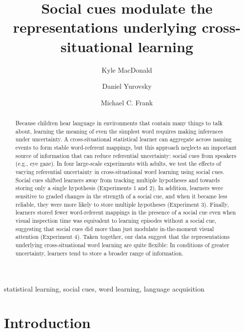 \documentclass[authoryear, review]{elsarticle}
\date{}
\begin{document}
\begin{frontmatter}

\title{Social cues modulate the representations underlying cross-situational
learning}

\author[km]{Kyle MacDonald}
\author[dy]{Daniel Yurovsky}
\author[mcf]{Michael C. Frank}
\address{Department of Psychology, Stanford University, United States}


\begin{abstract}
Because children hear language in environments that contain many things
to talk about, learning the meaning of even the simplest word requires
making inferences under uncertainty. A cross-situational statistical
learner can aggregate across naming events to form stable word-referent
mappings, but this approach neglects an important source of information
that can reduce referential uncertainty: social cues from speakers
(e.g., eye gaze). In four large-scale experiments with adults, we test
the effects of varying referential uncertainty in cross-situational word
learning using social cues. Social cues shifted learners away from
tracking multiple hypotheses and towards storing only a single
hypothesis (Experiments 1 and 2). In addition, learners were sensitive
to graded changes in the strength of a social cue, and when it became
less reliable, they were more likely to store multiple hypotheses
(Experiment 3). Finally, learners stored fewer word-referent mappings in
the presence of a social cue even when visual inspection time was
equivalent to learning episodes without a social cue, suggesting that
social cues did more than just modulate in-the-moment visual attention
(Experiment 4). Taken together, our data suggest that the
representations underlying cross-situational word learning are quite
flexible: In conditions of greater uncertainty, learners tend to store a
broader range of information.
\end{abstract}

\begin{keyword}
statistical learning, social cues, word learning, language acquisition
\end{keyword}

\end{frontmatter}

\section{Introduction}\label{introduction}
\end{document}
